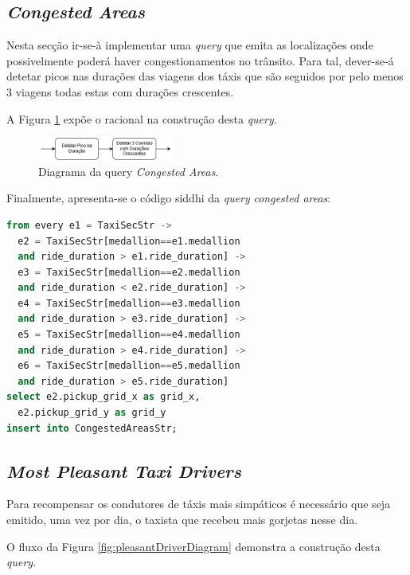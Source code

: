 \documentclass[article]{IEEEtran}
\begin{document}
\subsection{\textit{Congested Areas}}

Nesta secção ir-se-à implementar uma \textit{query} que emita as localizações onde possivelmente poderá haver congestionamentos no trânsito. Para tal, dever-se-á detetar picos nas durações das viagens dos táxis que são seguidos por pelo menos 3 viagens todas estas com durações crescentes.

A Figura \ref{fig:congestedAreasDiagram} expõe o racional na construção desta \textit{query}.

\begin{figure}[hbtp]
    \centering
        \includegraphics[width=0.4\textwidth]{images/congestedAreas}
    \caption{Diagrama da query \textit{Congested Areas}.}
    \label{fig:congestedAreasDiagram}
\end{figure}

Finalmente, apresenta-se o código siddhi da \textit{query} \textit{congested areas}:

\begin{lstlisting}[language=SQL]
from every e1 = TaxiSecStr ->
  e2 = TaxiSecStr[medallion==e1.medallion
  and ride_duration > e1.ride_duration] ->
  e3 = TaxiSecStr[medallion==e2.medallion
  and ride_duration < e2.ride_duration] ->
  e4 = TaxiSecStr[medallion==e3.medallion
  and ride_duration > e3.ride_duration] ->
  e5 = TaxiSecStr[medallion==e4.medallion
  and ride_duration > e4.ride_duration] ->
  e6 = TaxiSecStr[medallion==e5.medallion
  and ride_duration > e5.ride_duration]
select e2.pickup_grid_x as grid_x,
  e2.pickup_grid_y as grid_y
insert into CongestedAreasStr;
\end{lstlisting}



\subsection{\textit{Most Pleasant Taxi Drivers}}

Para recompensar os condutores de táxis mais simpáticos é necessário que seja emitido, uma vez por dia, o taxista que recebeu mais gorjetas nesse dia.

O fluxo da Figura \ref{fig:pleasantDriverDiagram} demonstra a construção desta \textit{query}.
\end{document}
